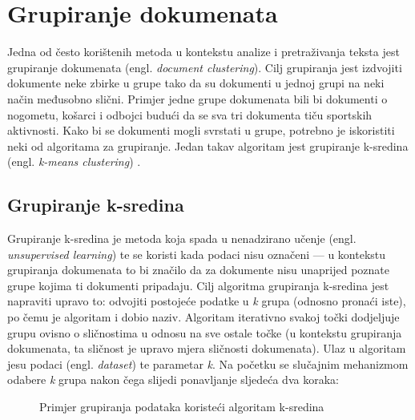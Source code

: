 \documentclass[times, utf8, zavrsni, numeric]{fer}
\begin{document}
\section{Grupiranje dokumenata}
Jedna od često korištenih metoda u kontekstu analize i pretraživanja teksta jest grupiranje dokumenata (engl. \textit{document clustering}). Cilj grupiranja jest izdvojiti dokumente neke zbirke u grupe tako da su dokumenti u jednoj grupi na neki način međusobno slični. Primjer jedne grupe dokumenata bili bi dokumenti o nogometu, košarci i odbojci budući da se sva tri dokumenta tiču sportskih aktivnosti. Kako bi se dokumenti mogli svrstati u grupe, potrebno je iskoristiti neki od algoritama za grupiranje. Jedan takav algoritam jest grupiranje k-sredina (engl. \textit{k-means clustering}) \cite{Steinbach2000ACO}.

\subsection{Grupiranje k-sredina}
\label{k_means_clustering}
Grupiranje k-sredina je metoda koja spada u nenadzirano učenje (engl. \textit{unsupervised learning}) te se koristi kada podaci nisu označeni — u kontekstu grupiranja dokumenata to bi značilo da za dokumente nisu unaprijed poznate grupe kojima ti dokumenti pripadaju. Cilj algoritma grupiranja k-sredina jest napraviti upravo to: odvojiti postojeće podatke u \textit{k} grupa (odnosno pronaći iste), po čemu je algoritam i dobio naziv. Algoritam iterativno svakoj točki dodjeljuje grupu ovisno o sličnostima u odnosu na sve ostale točke (u kontekstu grupiranja dokumenata, ta sličnost je upravo mjera sličnosti dokumenata).
Ulaz u algoritam jesu podaci (engl. \textit{dataset}) te parametar \textit{k}.
Na početku se slučajnim mehanizmom odabere \textit{k} grupa nakon čega slijedi ponavljanje sljedeća dva koraka:

\begin{figure}[h]
\centering
\def\svgwidth{\columnwidth}

\caption{Primjer grupiranja podataka koristeći algoritam k-sredina}
\label{img:clustering}
\end{figure}
\end{document}
